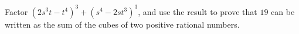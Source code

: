 Factor $\left(2s^3t-t^4\right)^3+\left(s^4-2st^3\right)^3$, and use the result to prove that $19$ can be written as the sum of the cubes of two positive rational numbers.
